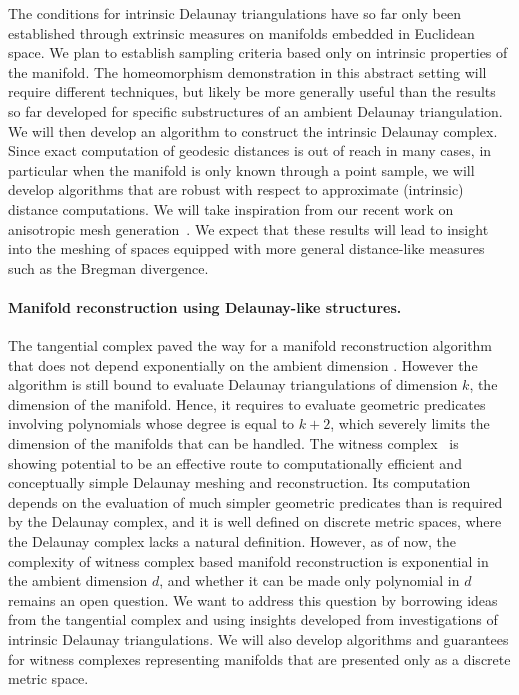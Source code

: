 The conditions for intrinsic Delaunay triangulations have so far only
been established through extrinsic measures on manifolds embedded in
Euclidean space. We plan to establish sampling criteria based only on
intrinsic properties of the manifold. The homeomorphism demonstration
in this abstract setting will require different techniques, but likely
be more generally useful than the results so far developed for
specific substructures of an ambient Delaunay triangulation.  We will
then develop an algorithm to construct the intrinsic Delaunay complex.
Since exact computation of geodesic distances is out of reach in
many cases, in particular when the manifold is only known through a
point sample, we will develop algorithms that are robust with respect to
approximate (intrinsic) distance computations. We will take
inspiration from our recent work on anisotropic mesh generation~\cite{bwy-luam-08}.
We expect that these results will
lead to insight into the meshing of spaces equipped with more general
distance-like measures such as the Bregman divergence.

\paragraph{Manifold reconstruction using Delaunay-like structures.}

The tangential complex paved the way for a
manifold reconstruction algorithm that does not depend exponentially
on the ambient dimension \cite{geometrica-7142i}. However the algorithm is still bound to
evaluate Delaunay triangulations of dimension $k$, the dimension of the
manifold. Hence, it requires to evaluate
geometric predicates involving polynomials whose degree is equal to
$k+2$, which  severely limits the dimension of the manifolds that can be
handled.
%
The witness complex~\cite{deSilva2008} is showing potential to be an
effective route to computationally efficient and conceptually simple
Delaunay meshing and reconstruction. Its computation depends on the
evaluation of much simpler geometric predicates than is required by
the Delaunay complex, and it is well defined on discrete metric
spaces, where the Delaunay complex lacks a natural
definition. However, as of now, the complexity of witness complex
based manifold reconstruction is exponential in the ambient dimension
$d$, and whether it can be made only polynomial in $d$ remains an
open question. We want to address this question by borrowing ideas from the
tangential complex and using insights developed from investigations of
intrinsic Delaunay triangulations.  We will also develop algorithms and
guarantees for witness complexes representing manifolds that are
presented only as a discrete metric space.

